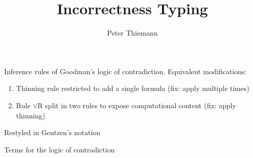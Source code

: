 \documentclass[11pt]{article}
\title{Incorrectness Typing}
\author{Peter Thiemann}
\newcommand\FormA{\varphi}
\newcommand\FormB{\psi}
\newcommand\FormC{\chi}
\newcommand\SuccC{\Gamma}
\newcommand\SuccD{\Delta}
\newcommand\Conj{\wedge}
\newcommand\Truth{\top}
\newcommand\Entails{\Longrightarrow}
\newcommand\SwitchGentzen{
  \renewcommand\FormA{A}
  \renewcommand\FormB{B}
  \renewcommand\FormC{C}
  \renewcommand\SuccC{\Lambda}
  \renewcommand\SuccD{\Theta}

  \renewcommand\Conj{\And}
  \renewcommand\Truth{\top}

  \renewcommand\Entails{\vdash}
}
\begin{document}
\maketitle

Inference rules of Goodman's logic of contradiction. Equivalent modifications:
\begin{enumerate}
\item Thinning rule restricted to add a single formula (fix: apply multiple times)
\item Rule $\vee$R split in two rules to expose computational content (fix: apply thinning)
\end{enumerate}


\clearpage
\SwitchGentzen
Restyled in Gentzen's notation


\clearpage
Terms for the logic of contradiction

\end{document}
